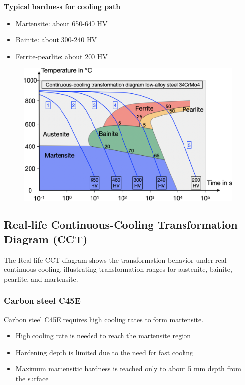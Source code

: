\documentclass{article}
\begin{document}
\textbf{Typical hardness for cooling path}
\begin{itemize}
  \item Martensite: about 650-640 HV
  \item Bainite: about 300-240 HV
  \item Ferrite-pearlite: about 200 HV
\end{itemize}

\newpage
\begin{figure}[ht!]
  \centering
  \includegraphics[width=.8\textwidth]{media/CCT_34CrMo4.png}
\end{figure}

\subsection{Real-life Continuous-Cooling Transformation Diagram (CCT)}
The Real-life CCT diagram shows the transformation behavior under real continuous cooling,
illustrating transformation ranges for austenite, bainite, pearlite, and martensite.

\subsubsection{Carbon steel C45E}
Carbon steel C45E requires high cooling rates to form martensite. 
\begin{itemize}
  \item High cooling rate is needed to reach the martensite region
  \item Hardening depth is limited due to the need for fast cooling
  \item Maximum martensitic hardness is reached only to about 5 mm depth from the surface
\end{itemize}
\end{document}
